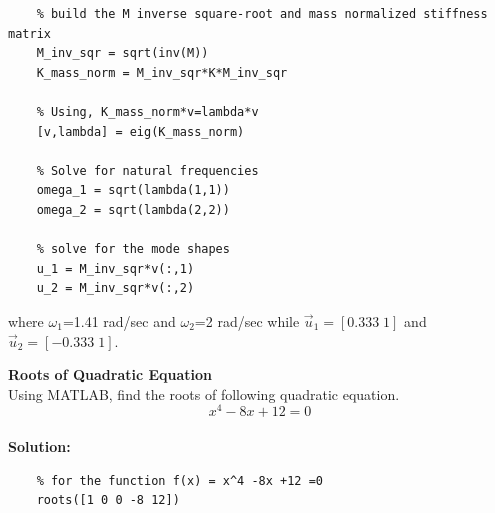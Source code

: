\documentclass[12pt,letter]{article}
\begin{document}
\begin{example}
\begin{minipage}{1\textwidth}
\begin{center}
\begin{lstlisting}
	% build the M inverse square-root and mass normalized stiffness matrix 
	M_inv_sqr = sqrt(inv(M))
	K_mass_norm = M_inv_sqr*K*M_inv_sqr
	
	% Using, K_mass_norm*v=lambda*v
	[v,lambda] = eig(K_mass_norm)
	
	% Solve for natural frequencies
	omega_1 = sqrt(lambda(1,1))
	omega_2 = sqrt(lambda(2,2))
	
	% solve for the mode shapes
	u_1 = M_inv_sqr*v(:,1)
	u_2 = M_inv_sqr*v(:,2)
			\end{lstlisting}
		\end{center}
	\end{minipage}
	\noindent where $\omega_1$=1.41 rad/sec and  $\omega_2$=2 rad/sec while $\vec{u}_1 = [0.333 \; 1]$ and $\vec{u}_2 = [-0.333 \; 1]$.
	
	\end{example}
	
	
	\begin{example}
	\textbf{Roots of Quadratic Equation} \\
Using MATLAB, find the roots of following quadratic equation.
\begin{equation}
x^4 -8x +12 = 0
\end{equation} \\

\noindent \textbf{Solution:} 

	\lstset{linewidth=5.8in}
	\begin{minipage}{1\textwidth}
		\begin{center}
			\begin{lstlisting}
	% for the function f(x) = x^4 -8x +12 =0
	roots([1 0 0 -8 12]) 
			\end{lstlisting}
		\end{center}
	\end{minipage}
	\end{example}
	
\end{document}
